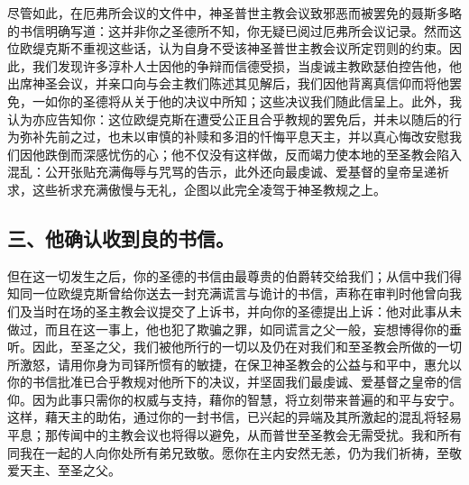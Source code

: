 尽管如此，在厄弗所会议的文件中，神圣普世主教会议致邪恶而被罢免的聂斯多略的书信明确写道：这并非你之圣德所不知，你无疑已阅过厄弗所会议记录。然而这位欧缇克斯不重视这些话，认为自身不受该神圣普世主教会议所定罚则的约束。因此，我们发现许多淳朴人士因他的争辩而信德受损，当虔诚主教欧瑟伯控告他，他出席神圣会议，并亲口向与会主教们陈述其见解后，我们因他背离真信仰而将他罢免，一如你的圣德将从关于他的决议中所知；这些决议我们随此信呈上。此外，我认为亦应告知你：这位欧缇克斯在遭受公正且合乎教规的罢免后，并未以随后的行为弥补先前之过，也未以审慎的补赎和多泪的忏悔平息天主，并以真心悔改安慰我们因他跌倒而深感忧伤的心；他不仅没有这样做，反而竭力使本地的至圣教会陷入混乱：公开张贴充满侮辱与咒骂的告示，此外还向最虔诚、爱基督的皇帝呈递祈求，这些祈求充满傲慢与无礼，企图以此完全凌驾于神圣教规之上。\par


\subsection{三、他确认收到良的书信。}

但在这一切发生之后，你的圣德的书信由最尊贵的伯爵转交给我们；从信中我们得知同一位欧缇克斯曾给你送去一封充满谎言与诡计的书信，声称在审判时他曾向我们及当时在场的圣主教会议提交了上诉书，并向你的圣德提出上诉：他对此事从未做过，而且在这一事上，他也犯了欺骗之罪，如同谎言之父一般，妄想博得你的垂听。因此，至圣之父，我们被他所行的一切以及仍在对我们和至圣教会所做的一切所激怒，请用你身为司铎所惯有的敏捷，在保卫神圣教会的公益与和平中，惠允以你的书信批准已合乎教规对他所下的决议，并坚固我们最虔诚、爱基督之皇帝的信仰。因为此事只需你的权威与支持，藉你的智慧，将立刻带来普遍的和平与安宁。这样，藉天主的助佑，通过你的一封书信，已兴起的异端及其所激起的混乱将轻易平息；那传闻中的主教会议也将得以避免，从而普世至圣教会无需受扰。我和所有同我在一起的人向你处所有弟兄致敬。愿你在主内安然无恙，仍为我们祈祷，至敬爱天主、至圣之父。\par


